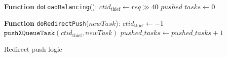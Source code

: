 \begin{algorithm}[bth]
\begin{algorithmic}[1]
    \item[{\bf Function} \texttt{doLoadBalancing}():]{}
        \STATE $ctid_{\text{thief}} \gets req\gg40$
        \STATE $pushed\_tasks \gets 0$
    \ENDIF
\vspace{1ex}
    \item[{\bf Function} \texttt{doRedirectPush}($newTask$):]{}
            \STATE $ctid_{\text{thief}} \gets -1$ 
        \ELSE
            \STATE $\texttt{pushXQueueTask}(ctid_{\text{thief}}, newTask)$
            \STATE $pushed\_tasks \gets pushed\_tasks + 1$
        \ENDIF
\end{algorithmic}

\vspace{1ex}

\caption{Redirect push logic}
\label{algo:rp-logic}
\end{algorithm}